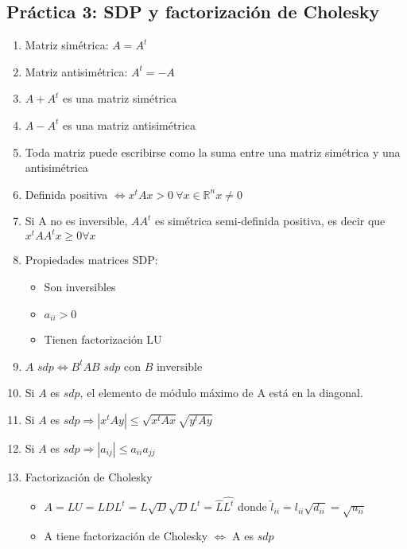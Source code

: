 \subsection*{Práctica 3: SDP y factorización de Cholesky}
\begin{enumerate}
    \item Matriz simétrica: $A=A^t$
    \item Matriz antisimétrica: $A^t=-A$
    \item $A+A^t$ es una matriz simétrica
    \item $A-A^t$ es una matriz antisimétrica
    \item Toda matriz puede escribirse como la suma entre una matriz simétrica y una antisimétrica
    \item Definida positiva $\iff x^tAx>0 \  \forall x \in \mathbb{R}^n x\neq0$
    \item Si A no es inversible, $AA^t$ es simétrica semi-definida positiva, es decir que $x^tAA^tx \geq 0 \forall x $
    \item Propiedades matrices SDP:
    \begin{itemize}
        \item Son inversibles
        \item $a_{ii} > 0$
        \item Tienen factorización LU
    \end{itemize}
    \item $A$ $sdp \iff B^tAB$ $sdp$ con $B$ inversible
    \item Si $A$ es $sdp$, el elemento de módulo máximo de A está en la diagonal. 
    \item Si $A$ es $sdp \Rightarrow |x^tAy| \leq \sqrt{x^tAx}\sqrt{y^tAy}$ 
    \item Si $A$ es $sdp \Rightarrow |a_{ij}|\leq a_{ii}a_{jj}$
    \item Factorización de Cholesky
    \begin{itemize}
        \item $A = LU = LDL^t = L\sqrt{D}\sqrt{D}L^t = \hat{L}\hat{L^t}$ donde $\hat{l}_{ii} = l_{ii}\sqrt{d_{ii}} = \sqrt{u_{ii}}$
        \item A tiene factorización de Cholesky $\iff$ A es $sdp$
    \end{itemize}
\end{enumerate}

